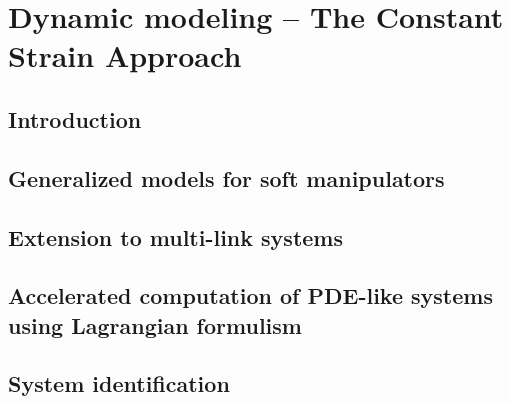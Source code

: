 \chapter[Dynamic modeling of Soft Robots -- PCC case]{Dynamic modeling -- The  Constant Strain Approach}
\label{chap: chapter 1}




\section{Introduction}
\label{sec: chap1 1_introduction}


\cleardoublepage
\section{Generalized models for soft manipulators}
\label{sec: chap2 section header}


\section{Extension to multi-link systems}
\label{sec: chap2 section header}


\clearpage
\section{Accelerated computation of PDE-like systems using Lagrangian formulism}
\label{sec: chap2 section header}


\clearpage
\section{System identification}
\label{sec: chap2 section header}



